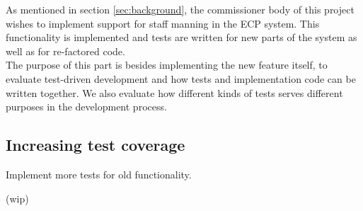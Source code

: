 As mentioned in section \ref{sec:background}, the commissioner body of
this project wishes to implement support for staff manning in the ECP
system. This functionality is implemented and tests are written for
new parts of the system as well as for re-factored code.\\

The purpose of this part is besides implementing the new feature itself,
to evaluate test-driven development and how tests and implementation
code can be written together. We also evaluate how different kinds of
tests serves different purposes in the development process.\\


\subsection{Increasing test coverage}

Implement more tests for old functionality.

(wip)

